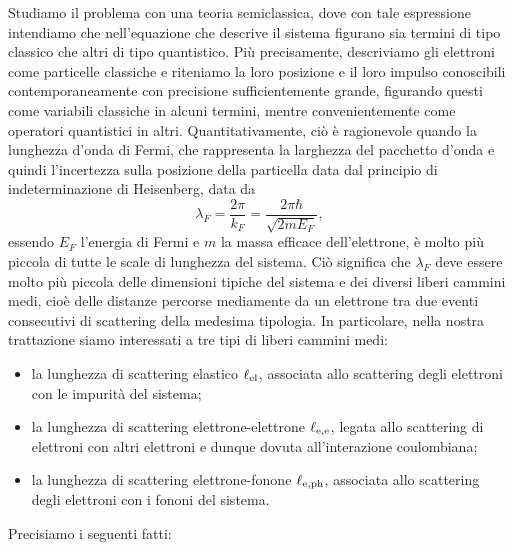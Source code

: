 Studiamo il problema con una teoria semiclassica, dove con tale espressione intendiamo che nell'equazione che descrive il sistema figurano sia termini di tipo classico che altri di tipo quantistico. Più precisamente, descriviamo gli elettroni come particelle classiche e riteniamo la loro posizione e il loro impulso conoscibili contemporaneamente con precisione sufficientemente grande, figurando questi come variabili classiche in alcuni termini, mentre convenientemente come operatori quantistici in altri. Quantitativamente, ciò è ragionevole quando la lunghezza d'onda di Fermi, che rappresenta la larghezza del pacchetto d'onda e quindi l'incertezza sulla posizione della particella data dal principio di indeterminazione di Heisenberg, data da
\begin{equation*}
    \lambda_F=\frac{2\pi}{k_F}=\frac{2\pi\hbar}{\sqrt{2mE_F}},
\end{equation*}
essendo $E_F$ l'energia di Fermi e $m$ la massa efficace dell'elettrone, è molto più piccola di tutte le scale di lunghezza del sistema. Ciò significa che $\lambda_F$ deve essere molto più piccola delle dimensioni tipiche del sistema e dei diversi liberi cammini medi, cioè delle distanze percorse mediamente da un elettrone tra due eventi consecutivi di scattering della medesima tipologia. In particolare, nella nostra trattazione siamo interessati a tre tipi di liberi cammini medi:
\begin{itemize}[leftmargin=0.5cm]
    \item la lunghezza di scattering elastico $\ell_{\rm el}$, associata allo scattering degli elettroni con le impurità del sistema;
    \item la lunghezza di scattering elettrone-elettrone $\ell_{\rm e,e}$, legata allo scattering di elettroni con altri elettroni e dunque dovuta all'interazione coulombiana;
    \item la lunghezza di scattering elettrone-fonone $\ell_{\rm e,ph}$, associata allo scattering degli elettroni con i fononi del sistema.
\end{itemize}
Precisiamo i seguenti fatti:
